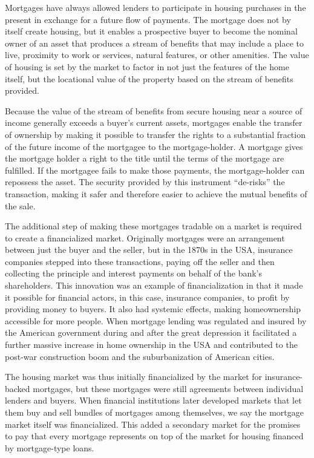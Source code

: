 Mortgages have always allowed lenders to participate in housing purchases in the present in exchange for a future flow of payments. The mortgage does not by itself create housing, but it enables a prospective buyer to become the nominal owner of an asset that produces a stream of benefits that may include a place to live, proximity to work or services, natural features, or other amenities. The value of housing is set by the market to factor in not just the features of the home itself, but the locational value of the property based on the stream of benefits provided. 

Because the value of the stream of benefits from secure housing near a source of income generally exceeds a buyer's current assets, mortgages enable the transfer of ownership by making it possible to transfer the rights to a substantial fraction of the future income of the mortgagee to the mortgage-holder. A mortgage gives the mortgage holder a right to the title until the terms of the mortgage are fulfilled.  If the mortgagee fails to make those payments, the mortgage-holder can repossess the asset. The security provided by this instrument ``de-risks'' the transaction, making it safer and therefore easier to achieve the mutual benefits of the sale. 

The additional step of making these mortgages tradable on a market is required to create a financialized market. Originally mortgages were an arrangement between just the buyer and the seller, but in the 1870s in the USA, insurance companies stepped into these transactions, paying off the seller and then collecting the principle and interest payments on behalf of the bank's shareholders. This innovation was an example of financialization in that it made it possible for financial actors, in this case,  insurance companies, to profit by providing money to buyers. It also had systemic effects, making homeownership accessible for more people. When mortgage lending was regulated and insured  by the American government during and after the great depression it facilitated a further massive increase in home ownership in the USA and contributed to the post-war construction boom and the suburbanization of American cities. 

The housing market was thus initially financialized by the market for insurance-backed mortgages, but these mortgages were still agreements between individual lenders and buyers. When financial institutions later developed markets that let them buy and sell bundles of mortgages among themselves, we say the mortgage market itself was financialized. This added %
a secondary market for the promises to pay that every mortgage represents on top of the market for housing financed by mortgage-type loans.
%

